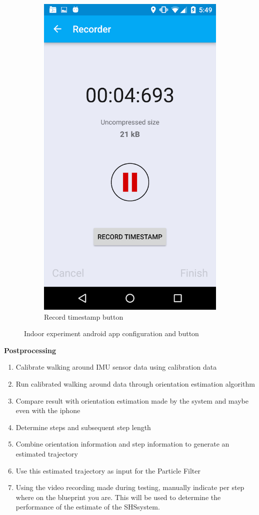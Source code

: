 \begin{figure}[H]
\begin{subfigure}[t]{.45\textwidth}
		\includegraphics[width=0.7\linewidth]{images/recording_timestamp_button}
		\caption{Record timestamp button}
		\label{fig:recording_timestamp_button}
	\end{subfigure}
\caption{Indoor experiment android app configuration and button}
\end{figure}


\textbf{Postprocessing}

\begin{enumerate}
	\def\labelenumi{\arabic{enumi}.}
	\tightlist
	\item
	Calibrate walking around \ac{IMU} sensor data using calibration data
	\item
	Run calibrated walking around data through orientation estimation
	algorithm
	\item
	Compare result with orientation estimation made by the system and
	maybe even with the iphone 
	\item
	Determine steps and subsequent step length 
	\item
	Combine orientation information and step information to generate an
	estimated trajectory
	\item
	Use this estimated trajectory as input for the Particle Filter
	\item
	Using the video recording made during testing, manually indicate per
	step where on the blueprint you are. This will be used to determine
	the performance of the estimate of the \ac{SHS}system. 
\end{enumerate}

